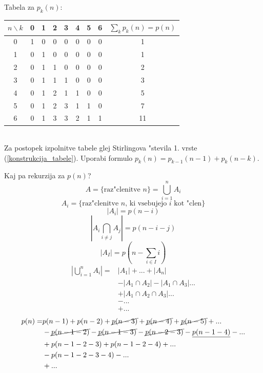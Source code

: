 \documentclass[a4paper,12pt]{article}
\theoremstyle{definition}
\theoremstyle{remark}
\begin{document}
Tabela za $p_k(n)$:
\begin{tabular}{c|c c c c c c c|c}
    $n \backslash k$ & 0 & 1 & 2 & 3 & 4 & 5 & 6 & $\sum_k p_k(n) = p(n)$\\
    \hline
    0 & 1 & 0 & 0 & 0 & 0 & 0 & 0 & 1 \\
    1 & 0 & 1 & 0 & 0 & 0 & 0 & 0 & 1 \\
    2 & 0 & 1 & 1 & 0 & 0 & 0 & 0 & 2 \\
    3 & 0 & 1 & 1 & 1 & 0 & 0 & 0 & 3 \\
    4 & 0 & 1 & 2 & 1 & 1 & 0 & 0 & 5 \\
    5 & 0 & 1 & 2 & 3 & 1 & 1 & 0 & 7 \\
    6 & 0 & 1 & 3 & 3 & 2 & 1 & 1 & 11 \\
\end{tabular}\\
Za postopek izpolnitve tabele glej Stirlingova "stevila 1. vrste (\ref{konstrukcija_tabele}). Uporabi formulo $p_k(n) = p_{k - 1}(n - 1) + p_k(n - k)$.

\label{TODO: why is this commented out}

Kaj pa rekurzija za $p(n)$?
\[A = \{\text{raz"clenitve }n\} = \bigcup_{i = 1}^n A_i\]
\[A_i = \{\text{raz"clenitve }n\text{, ki vsebujejo }i\text{ kot "clen}\}\]
\[|A_i| = p(n - i)\]
\[|A_i \bigcap_{i \neq j} A_j| = p(n - i - j)\]
\[|A_I| = p(n - \sum_{i \in I} i)\]
\begin{align}
	|\bigcup_{i = 1}^n A_i| = & |A_1| + ... + |A_n|\nonumber\\
    			& - |A_1 \cap A_2| - |A_1 \cap A_3| ...\nonumber\\
                & + |A_1 \cap A_2 \cap A_3| ...\nonumber\\
                & - ...\nonumber\\
                & + ...\nonumber
\end{align}
\label{TODO: tukej pogresam malo texta}
\begin{align}
	p(n) = & p(n - 1) + p(n - 2) + \cancel{p(n - 3)} + \cancel{p(n - 4)} + \cancel{p(n - 5)} + ...\nonumber\\
    	& - \cancel{p(n - 1 - 2)} - \cancel{p(n - 1 - 3)} - \cancel{p(n - 2 - 3)} - \underline{p(n - 1 - 4)} - ...\nonumber\\
        & + p(n - 1 - 2 - 3) + p(n - 1 - 2 - 4) + ...\nonumber\\
        & - p(n - 1 - 2 - 3 - 4) - ...\nonumber\\
        & + ...\nonumber
\end{align}
\end{document}
